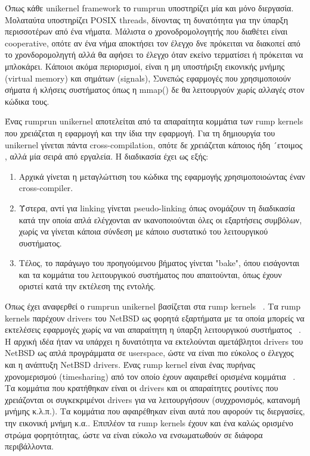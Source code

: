 Όπως κάθε unikernel framework το rumprun υποστηρίζει μία και μόνο διεργασία.
Μολαταύτα υποστηρίζει POSIX threads, δίνοντας τη δυνατότητα για την ύπαρξη
περισσοτέρων από ένα νήματα. Μάλιστα ο χρονοδρομολογητής που διαθέτει είναι
cooperative, οπότε αν ένα νήμα αποκτήσει τον έλεγχο δνε πρόκειται να διακοπεί
από το χρονδορομοληγτή αλλά θα αφήσει το έλεγχο όταν εκείνο τερματίσει ή
πρόκειται να μπλοκάρει. Κάποιοι ακόμα περιορισμοί, είναι η μη υποστήριξη
εικονικής μνήμης (virtual memory) και σημάτων (signals), Συνεπώς εφαρμογές που
χρησιμοποιούν σήματα ή κλήσεις συστήματος όπως η mmap() δε θα λειτουργούν χωρίς αλλαγές στον κώδικα τους.

Ένας rumprun unikernel αποτελείται από τα απαραίτητα κομμάτια των rump kernels
που χρειάζεται η εφαρμογή και την ίδια την εφαρμογή. Για τη δημιουργία του
unikernel γίνεται πάντα cross-compilation, οπότε δε χρειάζεται κάποιος ήδη
´ετοιμος , αλλά μία σειρά από εργαλεία. H διαδικασία έχει ως
εξής:
\begin{enumerate}
	\item Αρχικά γίνεται η μεταγλώττιση του κώδικα της εφαρμογής
		χρησιμοποιοώντας έναν cross-compiler.
	\item Ύστερα, αντί για linking γίνεται pseudo-linking όπως ονομάζουν τη
		διαδικασία κατά την οποία απλά ελέγχονται αν ικανοποιούνται όλες
		οι εξαρτήσεις συμβόλων, χωρίς να γίνεται κάποια σύνδεση με
		κάποιο συστατικό του λειτουργικού συστήματος.
	\item Τέλος, το παράγωγο του προηγούμενου βήματος γίνεται "bake", όπου
		εισάγονται και τα κομμάτια του λειτουργικού συστήματος που
		απαιτούνται, όπως έχουν οριστεί κατά την εκτέλεση της εντολής.
\end{enumerate}

Όπως έχει αναφερθεί ο rumprun unikernel βασίζεται στα rump kernels
~\cite{rumprun_Xen}. Τα rump kernels παρέχουν drivers του NetBSD ως φορητά
εξαρτήματα με τα οποία μπορείς να εκτελέσεις εφαρμογές χωρίς να ναι απαραίτητη η
ύπαρξη λειτουργικού συστήματος ~\cite{kantee2014rump}. Η αρχική ιδέα ήταν να
υπάρχει η δυνατότητα να εκτελούνται αμετάβλητοι drivers του NetBSD ως απλά
προγράμματα σε userspace, ώστε να είναι πιο εύκολος ο έλεγχος και η ανάπτυξη
NetBSD drivers. Ένας rump kernel είναι ένας πυρήνας χρονομερισμού (timesharing)
από τον οποίο έχουν αφαιρεθεί ορισμένα κομμάτια ~\cite{kantee2012design}. Τα
κομμάτια που κρατήθηκαν είναι οι drivers και οι απαραίτητες ρουτίνες που
χρειάζονται οι συγκεκριμένοι drivers για να λειτουργήσουν (συχχρονισμός,
κατανομή μνήμης κ.λ.π.). Τα κομμάτια που αφαιρέθηκαν είναι αυτά που αφορούν τις
διεργασίες, την εικονική μνήμη κ.α.. Επιπλέον τα rump kernels έχουν και ένα
καλώς ορισμένο στρώμα φορητότητας, ώστε να είναι εύκολο να ενσωματωθούν σε
διάφορα περιβάλλοντα.

